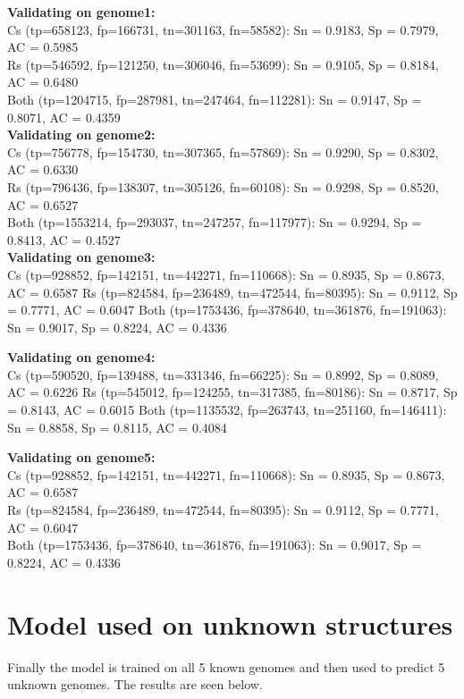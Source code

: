 \documentclass[paper=a4, fontsize=11pt]{scrartcl} %
\numberwithin{equation}{section} %
\numberwithin{figure}{section} %
\numberwithin{table}{section} %
\begin{document}
\textbf{Validating on genome1:} \\
Cs   (tp=658123, fp=166731, tn=301163, fn=58582): Sn = 0.9183, Sp = 0.7979, AC = 0.5985 \\
Rs   (tp=546592, fp=121250, tn=306046, fn=53699): Sn = 0.9105, Sp = 0.8184, AC = 0.6480 \\
Both (tp=1204715, fp=287981, tn=247464, fn=112281): Sn = 0.9147, Sp = 0.8071, AC = 0.4359 \\

\textbf{Validating on genome2:} \\
Cs   (tp=756778, fp=154730, tn=307365, fn=57869): Sn = 0.9290, Sp = 0.8302, AC = 0.6330 \\
Rs   (tp=796436, fp=138307, tn=305126, fn=60108): Sn = 0.9298, Sp = 0.8520, AC = 0.6527 \\
Both (tp=1553214, fp=293037, tn=247257, fn=117977): Sn = 0.9294, Sp = 0.8413, AC = 0.4527 \\


\textbf{Validating on genome3:} \\
Cs   (tp=928852, fp=142151, tn=442271, fn=110668): Sn = 0.8935, Sp = 0.8673, AC = 0.6587
Rs   (tp=824584, fp=236489, tn=472544, fn=80395): Sn = 0.9112, Sp = 0.7771, AC = 0.6047
Both (tp=1753436, fp=378640, tn=361876, fn=191063): Sn = 0.9017, Sp = 0.8224, AC = 0.4336

\textbf{Validating on genome4:} \\
Cs   (tp=590520, fp=139488, tn=331346, fn=66225): Sn = 0.8992, Sp = 0.8089, AC = 0.6226
Rs   (tp=545012, fp=124255, tn=317385, fn=80186): Sn = 0.8717, Sp = 0.8143, AC = 0.6015
Both (tp=1135532, fp=263743, tn=251160, fn=146411): Sn = 0.8858, Sp = 0.8115, AC = 0.4084

\textbf{Validating on genome5:} \\
Cs   (tp=928852, fp=142151, tn=442271, fn=110668): Sn = 0.8935, Sp = 0.8673, AC = 0.6587 \\
Rs   (tp=824584, fp=236489, tn=472544, fn=80395): Sn = 0.9112, Sp = 0.7771, AC = 0.6047 \\
Both (tp=1753436, fp=378640, tn=361876, fn=191063): Sn = 0.9017, Sp = 0.8224, AC = 0.4336 \\

\section{Model used on unknown structures}
Finally the model is trained on all 5 known genomes and then used to predict 5 unknown genomes. The results are seen below. 
\end{document}
